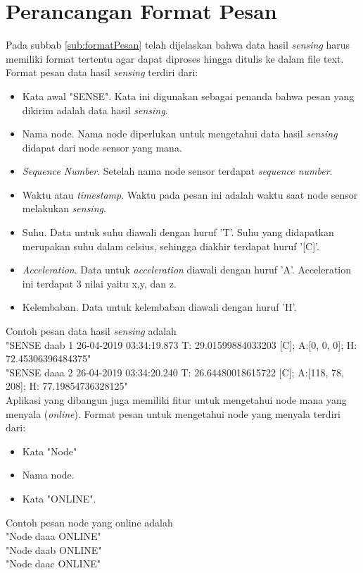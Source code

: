 \section{Perancangan Format Pesan}
Pada subbab \ref{sub:formatPesan} telah dijelaskan bahwa data hasil \textit{sensing} harus memiliki format tertentu agar dapat diproses hingga ditulis ke dalam file text. Format pesan data hasil \textit{sensing} terdiri dari:
\begin{itemize}
    \item Kata awal "SENSE". Kata ini digunakan sebagai penanda bahwa pesan yang dikirim adalah data hasil \textit{sensing}.
    \item Nama node. Nama node diperlukan untuk mengetahui data hasil \textit{sensing} didapat dari node sensor yang mana.
    \item \textit{Sequence Number}. Setelah nama node sensor terdapat \textit{sequence number}.
    \item Waktu atau \textit{timestamp}. Waktu pada pesan ini adalah waktu saat node sensor melakukan \textit{sensing}.
    \item Suhu. Data untuk suhu diawali dengan huruf 'T'. Suhu yang didapatkan merupakan suhu dalam celsius, sehingga diakhir terdapat huruf '[C]'.
    \item \textit{Acceleration}. Data untuk \textit{acceleration} diawali dengan huruf 'A'. Acceleration ini terdapat 3 nilai yaitu x,y, dan z.
    \item Kelembaban. Data untuk kelembaban diawali dengan huruf 'H'.
\end{itemize}
Contoh pesan data hasil \textit{sensing} adalah \\
"SENSE daab 1 26-04-2019 03:34:19.873 T: 29.01599884033203 [C]; A:[0, 0, 0]; H: 72.45306396484375"\\
"SENSE daaa 2 26-04-2019 03:34:20.240 T: 26.64480018615722 [C]; A:[118, 78, 208]; H: 77.19854736328125"\\

Aplikasi yang dibangun juga memiliki fitur untuk mengetahui node mana yang menyala (\textit{online}). Format pesan untuk mengetahui node yang menyala terdiri dari:
\begin{itemize}
    \item Kata "Node"
    \item Nama node.
    \item Kata "ONLINE".
\end{itemize}
Contoh pesan node yang online adalah\\
"Node daaa ONLINE"\\
"Node daab ONLINE"\\
"Node daac ONLINE"\\

